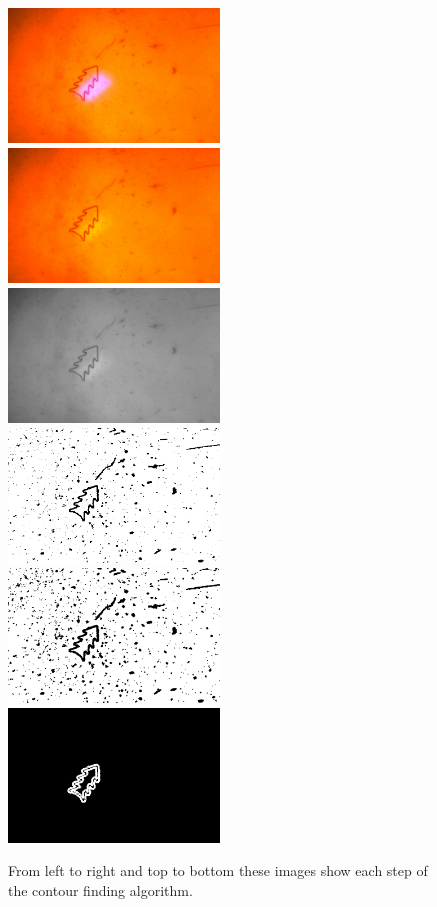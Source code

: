 \documentclass[11pt]{article}
\begin{document}
\begin{figure}[h!]
  \includegraphics[width=0.5\textwidth]{original-0000}
  \includegraphics[width=0.5\textwidth]{no_blue-0000}
  \includegraphics[width=0.5\textwidth]{grayscale-0000}
  \includegraphics[width=0.5\textwidth]{adaptive_thresh-0000}
  \includegraphics[width=0.5\textwidth]{eroded-0000}
  \includegraphics[width=0.5\textwidth]{contours-0000}
  \caption{From left to right and top to bottom these images show each step of the contour
  finding algorithm.}
\end{figure}
\end{document}
